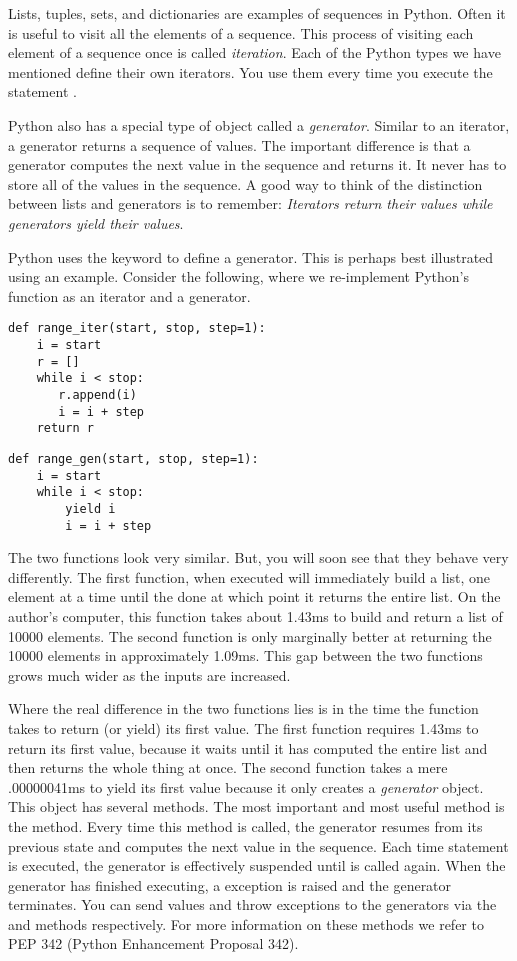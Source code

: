 \label{lab:Python_Generators}

Lists, tuples, sets, and dictionaries are examples of sequences in Python.
Often it is useful to visit all the elements of a sequence.  This process of visiting
each element of a sequence once is called \emph{iteration}. 
Each of the Python types we have mentioned define their own iterators.
You use them every time you execute the statement .

Python also has a special type of object called a \emph{generator}.
Similar to an iterator, a generator returns a sequence of values.
The important difference is that a generator computes the next value in the sequence and returns it.
It never has to store all of the values in the sequence.
A good way to think of the distinction between lists and generators is to remember: \emph{Iterators return their values while generators yield their values}.

Python uses the  keyword to define a generator.  This is perhaps best illustrated using an example.  Consider the following, where we re-implement Python's  function as an iterator and a generator.
\begin{lstlisting}
def range_iter(start, stop, step=1):
    i = start
    r = []
    while i < stop:
       r.append(i)
       i = i + step
    return r
\end{lstlisting}
\begin{lstlisting}
def range_gen(start, stop, step=1):
    i = start
    while i < stop:
        yield i
        i = i + step
\end{lstlisting}
The two functions look very similar.  But, you will soon see that they behave very differently.
The first function, when executed will immediately build a list, one element at a time until the done
at which point it returns the entire list.  On the author's computer, this function takes about 1.43ms
to build and return a list of 10000 elements.  The second function is only marginally better at
returning the 10000 elements in approximately 1.09ms.  
This gap between the two functions grows much wider as the inputs are increased.

Where the real difference in the two functions lies is in the time the function takes to return (or yield) its first value.
The first function requires 1.43ms to return its first value, because it waits until it has computed the entire list and then returns the whole thing at once.
The second function takes a mere .00000041ms to yield its first value because it only creates a \emph{generator} object.
This object has several methods.
The most important and most useful method is the  method.  Every time this method is called, 
the generator resumes from its previous state and computes the next value in the sequence. Each time  statement is executed, the generator is effectively suspended until  is called again.
When the generator has finished executing, a  exception is raised and the generator terminates.
You can send values and throw exceptions to the generators via the  and  methods respectively.
For more information on these methods we refer to PEP 342 (Python Enhancement Proposal 342).

